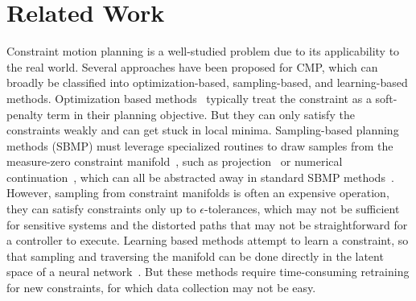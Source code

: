 \documentclass[letterpaper, 10 pt, conference]{ieeeconf}
\begin{document}
\section{Related Work}
Constraint motion planning is a well-studied problem due to its applicability to the real world. Several approaches have been proposed for CMP, which can broadly be classified into optimization-based, sampling-based, and learning-based methods. Optimization based methods~\cite{dragan2011manipulation, schulman2014motion,sundaralingam2023curobo1} typically treat the constraint as a soft-penalty term in their planning objective. But they can only satisfy the constraints weakly and can get stuck in local minima.
Sampling-based planning methods (SBMP) must leverage specialized routines to draw samples from the measure-zero constraint manifold~\cite{kingston2018sampling}, such as projection~\cite{berenson2009manipulation} or numerical continuation~\cite{jaillet2013atlasrrt, kim2016tangent}, which can all be abstracted away in standard SBMP methods~\cite{kingston2019exploring}.
However, sampling from constraint manifolds is often an expensive operation, they can satisfy constraints only up to $\epsilon$-tolerances, which may not be sufficient for sensitive systems and the distorted paths that may not be straightforward for a controller to execute. 
Learning based methods attempt to learn a constraint, so that sampling and traversing the manifold can be done directly in the latent space of a neural network~\cite{qureshi2020neural, qureshi2021constrained, ni2024physics}.
But these methods require time-consuming retraining for new constraints, for which data collection may not be easy.
\end{document}
